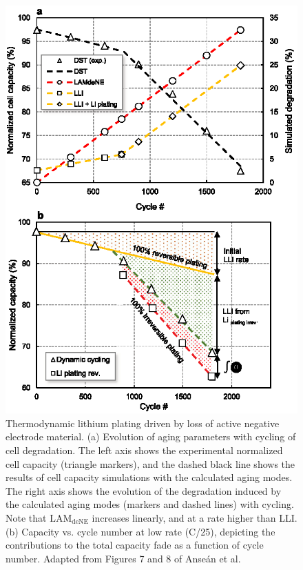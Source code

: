 \documentclass[journal=jpcl, manuscript=article, layout=onecolumn]{achemso}
\begin{document}
\begin{figure}[ht]
    \centering
    \includegraphics[scale=1]{figures/thermo_plating_dubarry.eps}
    \caption{Thermodynamic lithium plating driven by loss of active negative electrode material. (a) Evolution of aging parameters with cycling of cell degradation. The left axis shows the experimental normalized cell capacity (triangle markers), and the dashed black line shows the results of cell capacity simulations with the calculated aging modes. The right axis shows the evolution of the degradation induced by the calculated aging modes (markers and dashed lines) with cycling. Note that $\mathrm{LAM_{deNE}}$ increases linearly, and at a rate higher than LLI.
    (b) Capacity vs. cycle number at low rate (C/25), depicting the contributions to the total capacity fade as a function of cycle number.
    Adapted from Figures 7 and 8 of Anse\'an et al.\cite{ansean_operando_2017}}
    \label{fig:thermo_plating}
\end{figure}
\end{document}
